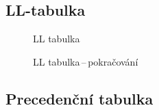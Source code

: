 \documentclass[11spt]{article}
\begin{document}
\begin{landscape}
    \subsection{LL-tabulka}
    \thispagestyle{empty}
    \begin{figure}[ht]
        \begin{center}
        \end{center}
        \caption{LL tabulka}
    \end{figure}
\end{landscape}

\begin{landscape}
    \thispagestyle{empty}
    \begin{figure}[ht]
        \begin{center}
        \end{center}
        \caption{LL tabulka\,--\,pokračování}
    \end{figure}
\end{landscape}


\subsection{Precedenční tabulka}
\end{document}
